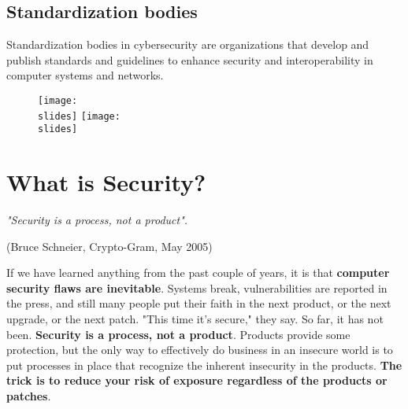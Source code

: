 {  \subsection*{Standardization bodies}
  Standardization bodies in cybersecurity are organizations that develop and publish standards and guidelines to enhance security and interoperability in computer systems and networks.
  \begin{figure}[!h]
    \centering
    \texttt{[image: \\slides]}
    \texttt{[image: \\slides]}
  \end{figure}
} {}




\section{What is Security?}
\emph{"Security is a process, not a product".}
\begin{flushright}
  (Bruce Schneier, Crypto-Gram, May 2005)
\end{flushright}
If we have learned anything from the past couple of years, it is that \textbf{computer security flaws are inevitable}.
Systems break, vulnerabilities are reported in the press, and still many people put their faith in the next product, or the next upgrade, or the next patch. "This time it's secure," they say. So far, it has not been.
\textbf{Security is a process, not a product}. Products provide some protection, but the only way to effectively do business in an insecure world is to put processes in place that recognize the inherent insecurity in the products.
\textbf{The trick is to reduce your risk of exposure regardless of the products or patches}.

